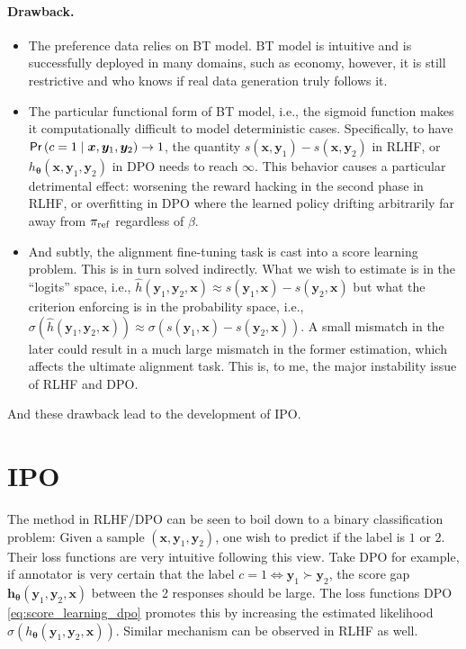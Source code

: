 \documentclass[11pt,a4paper]{article}
\begin{document}
\paragraph{Drawback.} 
\begin{itemize}
    \item The preference data relies on BT model. BT model is intuitive and is successfully deployed in many domains, such as economy, however, it is still restrictive and who knows if real data generation truly follows it.
    \item The particular functional form of BT model, i.e., the sigmoid function makes it computationally difficult to model deterministic cases. Specifically, to have $\textsf{Pr}\left(c=1 \mid \bm{x}, \bm{y}_1, \bm{y}_2\right) \to 1$, the quantity $s(\bm{x}, \bm{y}_1) - s(\bm{x}, \bm{y}_2)$ in RLHF, or $h_{\boldsymbol \theta}(\bm{x}, \bm{y}_1, \bm{y}_2)$ in DPO needs to reach $\infty$. This behavior causes a particular detrimental effect: worsening the reward hacking in the second phase in RLHF, or overfitting in DPO where the learned policy drifting arbitrarily far away from $\pi_{\rm ref}$ regardless of $\beta$. 
    \item And subtly, the alignment fine-tuning task is cast into a score learning problem. This is in turn solved indirectly.
What we wish to estimate is in the ``logits'' space, i.e., $\widehat{h}(\bm{y}_1, \bm{y}_2, \bm{x}) \approx s(\bm{y}_1, \bm{x}) - s(\bm{y}_2, \bm{x})$ but what the criterion enforcing is in the probability space, i.e., $\sigma(\widehat{h}(\bm{y}_1, \bm{y}_2, \bm{x})) \approx \sigma(s(\bm{y}_1, \bm{x}) - s(\bm{y}_2, \bm{x}))$. 
A small mismatch in the later could result in a much large mismatch in the former estimation, which affects the ultimate alignment task. This is, to me, the major instability issue of RLHF and DPO.
\end{itemize}
And these drawback lead to the development of IPO.

\section{IPO}%
\label{sec:ipo}

The method in RLHF/DPO can be seen to boil down to a binary classification problem: Given a sample $(\bm{x}, \bm{y}_1, \bm{y}_2)$, one wish to predict if the label is $1$ or $2$. Their loss functions are very intuitive following this view.
Take DPO for example, if annotator is very certain that the label $c=1 \Leftrightarrow \bm{y}_1 \succ \bm{y}_2$, the score gap $\bm{h}_{\boldsymbol \theta}(\bm{y}_1, \bm{y}_2, \bm{x})$ between the 2 responses should be large.
The loss functions DPO \eqref{eq:score_learning_dpo} promotes this by increasing the estimated likelihood $\sigma(h_{\boldsymbol \theta}(\bm{y}_1, \bm{y}_2, \bm{x}))$. Similar mechanism can be observed in RLHF as well.
\end{document}
